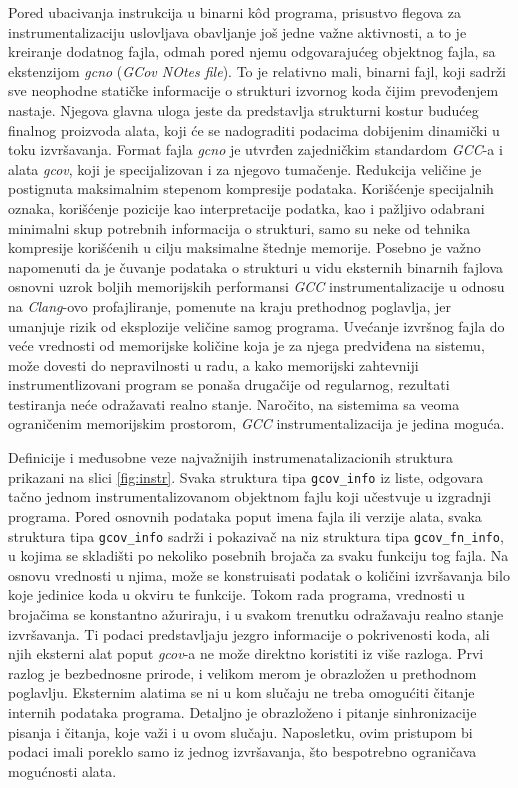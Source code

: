 \documentclass[12pt,oneside]{memoir}
\newcommand{\kod}[1]{\texttt{#1}}
\newcommand{\strano}[1]{\textit{#1}}
\begin{document}
Pored ubacivanja instrukcija u binarni k\^{o}d programa, prisustvo flegova za instrumentalizaciju uslovljava obavljanje još jedne važne aktivnosti, a to je kreiranje dodatnog fajla, odmah pored njemu odgovarajućeg objektnog fajla, sa ekstenzijom \strano{gcno} (\strano{GCov NOtes file}). To je relativno mali, binarni fajl, koji sadrži sve neophodne statičke informacije o strukturi izvornog koda čijim prevođenjem nastaje. Njegova glavna uloga jeste da predstavlja strukturni kostur budućeg finalnog proizvoda alata, koji će se nadograditi podacima dobijenim dinamički u toku izvršavanja. Format fajla \strano{gcno} je utvrđen zajedničkim standardom \strano{GCC}-a i alata \strano{gcov}, koji je specijalizovan i za njegovo tumačenje. Redukcija veličine je postignuta maksimalnim stepenom kompresije podataka. Korišćenje specijalnih oznaka, korišćenje pozicije kao interpretacije podatka, kao i pažljivo odabrani minimalni skup potrebnih informacija o strukturi, samo su neke od tehnika kompresije korišćenih u cilju maksimalne štednje memorije. Posebno je važno napomenuti da je čuvanje podataka o strukturi u vidu eksternih binarnih fajlova osnovni uzrok boljih memorijskih performansi \strano{GCC} instrumentalizacije u odnosu na \strano{Clang}-ovo profajliranje, pomenute na kraju prethodnog poglavlja, jer umanjuje rizik od eksplozije veličine samog programa.
Uvećanje izvršnog fajla do veće vrednosti od memorijske količine koja je za njega predviđena na sistemu, može dovesti do nepravilnosti u radu, a kako memorijski zahtevniji instrumentlizovani program se ponaša drugačije od regularnog, rezultati testiranja neće odražavati realno stanje. Naročito, na sistemima sa veoma ograničenim memorijskim prostorom, \strano{GCC} instrumentalizacija je jedina moguća.

Definicije i međusobne veze najvažnijih instrumenatalizacionih struktura prikazani na slici \ref{fig:instr}. 
Svaka struktura tipa \kod{gcov\_info} iz liste, odgovara tačno jednom instrumentalizovanom objektnom fajlu koji učestvuje u izgradnji programa. Pored osnovnih podataka poput imena fajla ili verzije alata, svaka struktura tipa \kod{gcov\_info} sadrži i pokazivač na niz struktura tipa \kod{gcov\_fn\_info}, u kojima se skladišti po nekoliko posebnih brojača za svaku funkciju tog fajla. Na osnovu vrednosti u njima, može se konstruisati podatak o količini izvršavanja bilo koje jedinice koda u okviru te funkcije. Tokom rada programa, vrednosti u brojačima se konstantno ažuriraju, i u svakom trenutku odražavaju realno stanje izvršavanja. Ti podaci predstavljaju jezgro informacije o pokrivenosti koda, ali njih eksterni alat poput \strano{gcov}-a ne može direktno koristiti iz više razloga. Prvi razlog je bezbednosne prirode, i velikom merom je obrazložen u prethodnom poglavlju. Eksternim alatima se ni u kom slučaju ne treba omogućiti čitanje internih podataka programa. Detaljno je obrazloženo i pitanje sinhronizacije pisanja i čitanja, koje važi i u ovom slučaju. Naposletku, ovim pristupom bi podaci imali poreklo samo iz jednog izvršavanja, što bespotrebno ograničava mogućnosti alata. 
\\
\end{document}
